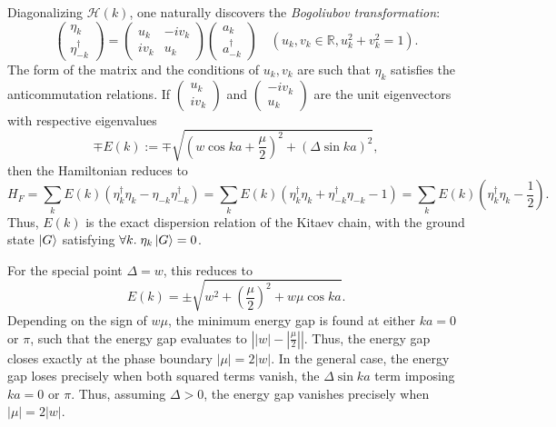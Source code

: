 \documentclass{article}
\begin{document}
Diagonalizing $\mathcal{H}(k)$, one naturally discovers the \emph{Bogoliubov transformation}:
\[
    \begin{pmatrix}
        \eta_k \\ \eta_{-k}^\dagger
    \end{pmatrix} = \begin{pmatrix}
        u_k & -iv_k \\ iv_k & u_k
    \end{pmatrix} \begin{pmatrix}
        a_k \\ a_{-k}^\dagger
    \end{pmatrix}\quad (u_k, v_k \in \mathbb{R}, u_k^2 + v_k^2 = 1).
\]
The form of the matrix and the conditions of $u_k, v_k$ are such that
$\eta_k$ satisfies the anticommutation relations.
If $\begin{pmatrix} u_k \\ iv_k \end{pmatrix}$ and $\begin{pmatrix} -iv_k \\ u_k \end{pmatrix}$
are the unit eigenvectors with respective eigenvalues
\[
    \mp E(k) := \mp \sqrt{
        \left(w\cos ka + \frac{\mu}{2}\right)^2
        + \left(\Delta\sin ka\right)^2},
\]
then the Hamiltonian reduces to
\[
    H_F = \sum_k E(k) \left(\eta_k^\dagger\eta_k - \eta_{-k}\eta_{-k}^\dagger\right)
    = \sum_k E(k) \left(\eta_k^\dagger\eta_k + \eta_{-k}^\dagger\eta_{-k} - 1\right)
    = \sum_k E(k) \left(\eta_k^\dagger\eta_k - \frac{1}{2}\right).
\]
Thus, $E(k)$ is the exact dispersion relation of the Kitaev chain,
with the ground state $\ket{G}$ satisfying $\forall k.\; \eta_k\ket{G} = 0$.

For the special point $\Delta = w$, this reduces to
\[
    E(k) = \pm\sqrt{w^2 + \left(\frac{\mu}{2}\right)^2+w\mu\cos ka}.
\]
Depending on the sign of $w\mu$, the minimum energy gap is found at either $ka = 0$ or $\pi$,
such that the energy gap evaluates to $\left|\left|w\right|-\left|\frac{\mu}{2}\right|\right|$.
Thus, the energy gap closes exactly at the phase boundary $|\mu| = 2|w|$.
In the general case, the energy gap loses precisely when both squared terms vanish,
the $\Delta\sin ka$ term imposing $ka = 0$ or $\pi$.
Thus, assuming $\Delta > 0$, the energy gap vanishes precisely when $|\mu| = 2|w|$.
\end{document}
